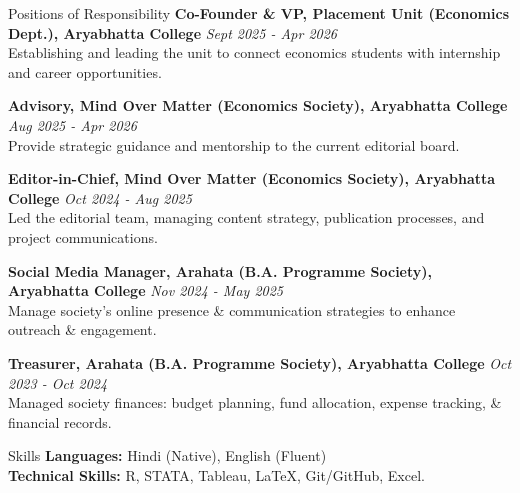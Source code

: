 \documentclass{resume} %
\begin{document}
	\begin{rSection}{Positions of Responsibility}
		\textbf{Co-Founder \& VP, Placement Unit (Economics Dept.), Aryabhatta College}
		\hfill \textit{Sept 2025 - Apr 2026} \vspace{2pt}\\
		Establishing and leading the unit to connect economics students with internship and career opportunities.
		
		\textbf{Advisory, Mind Over Matter (Economics Society), Aryabhatta College}
		\hfill \textit{Aug 2025 - Apr 2026} \vspace{2pt}\\
		Provide strategic guidance and mentorship to the current editorial board.
		
		\textbf{Editor-in-Chief, Mind Over Matter (Economics Society), Aryabhatta College}
		\hfill \textit{Oct 2024 - Aug 2025} \vspace{2pt}\\
		Led the editorial team, managing content strategy, publication processes, and project communications.
		
		\textbf{Social Media Manager, Arahata (B.A. Programme Society), Aryabhatta College}
		\hfill \textit{Nov 2024 - May 2025} \vspace{2pt}\\
		Manage society's online presence \& communication strategies to enhance outreach \& engagement.
		
		\textbf{Treasurer, Arahata (B.A. Programme Society), Aryabhatta College}
		\hfill \textit{Oct 2023 - Oct 2024} \vspace{2pt}\\
		Managed society finances: budget planning, fund allocation, expense tracking, \& financial records. 
	\end{rSection}
	
	
	\begin{rSection}{Skills}
		\textbf{Languages:} Hindi (Native), English (Fluent) \\
		\textbf{Technical Skills:} R, STATA, Tableau, LaTeX, Git/GitHub, Excel. \\
	\end{rSection}
	
	
\end{document}

